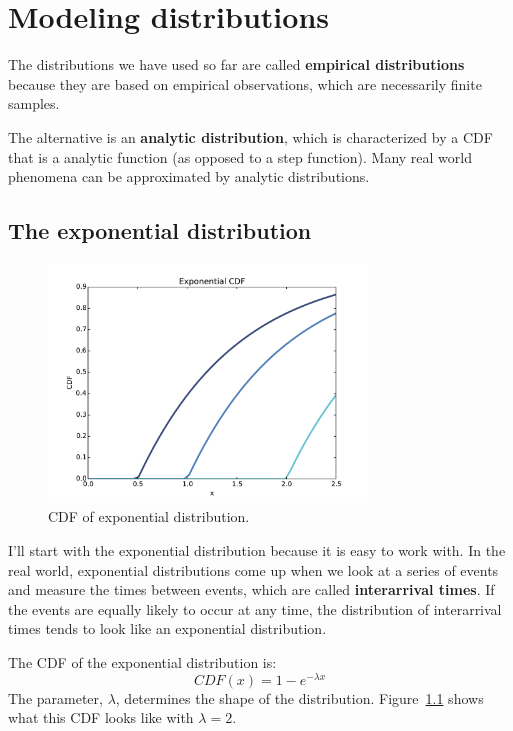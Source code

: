 \documentclass[12pt]{book}
\begin{document}
\chapter{Modeling distributions}
\label{analytic}

The distributions we have used so far are called {\bf
  empirical distributions} because they are based on empirical
observations, which are necessarily finite samples.

The alternative is an {\bf analytic distribution}, which is
characterized by a CDF that is a analytic function (as opposed to a
step function).  Many real world phenomena can be approximated by
analytic distributions.


\section{The exponential distribution}

\begin{figure}
\centerline{\includegraphics[height=2.5in]{figs/expo_cdf.pdf}}
\caption{CDF of exponential distribution.}
\label{expo_cdf}
\end{figure}

I'll start with the exponential distribution because it is
easy to work with.  In the real world, exponential distributions
come up when we look at a series of events and measure the
times between events, which are called {\bf interarrival times}.
If the events are equally likely to occur at any time, the distribution
of interarrival times tends to look like an exponential distribution.

The CDF of the exponential distribution is:
%
\[ CDF(x) = 1 - e^{-\lambda x} \]
%
The parameter, $\lambda$, determines the shape of the
distribution.  Figure~\ref{expo_cdf} shows what this CDF looks like with
$\lambda = 2$.
\end{document}
